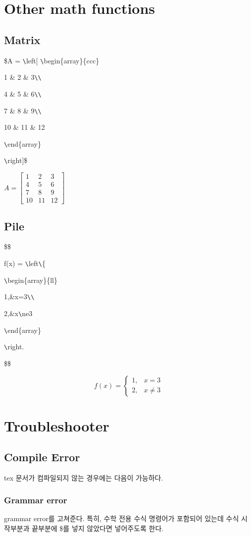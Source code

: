 \documentclass[11pt]{article}
\begin{document}
\section{Other math functions}
\subsection{Matrix}

\$A = \verb+\+left[ \verb+\+begin\{array\}\{ccc\}

1 \& 2 \& 3\verb+\+\verb+\+

4 \& 5 \& 6\verb+\+\verb+\+

7 \& 8 \& 9\verb+\+\verb+\+

10 \& 11 \& 12

\verb+\+end\{array\}

\verb+\+right]\$

$A = \left[ \begin{array}{ccc}
1 & 2 & 3\\
4 & 5 & 6\\
7 & 8 & 9\\
10 & 11 & 12
\end{array}
\right]$

\longline
\subsection{Pile}
\$\$

f(x) = \verb+\+left\verb+\+\{

\verb+\+begin\{array\}\{ll\}

1,\&x=3\verb+\+\verb+\+

2,\&x\verb+\+ne3

\verb+\+end\{array\}

\verb+\+right.

\$\$

$$
f(x) = \left\{
\begin{array}{ll}
1,&x=3\\
2,&x\ne3
\end{array}
\right.
$$

\longline
\section{Troubleshooter}
\subsection{Compile Error}
tex 문서가 컴파일되지 않는 경우에는 다음이 가능하다.
\subsubsection{Grammar error}
grammar error를 고쳐준다.
특히, 수학 전용 수식 명령어가 포함되어 있는데 수식 시작부분과 끝부분에 \$를 넣지 않았다면 넣어주도록 한다. 
\end{document}
